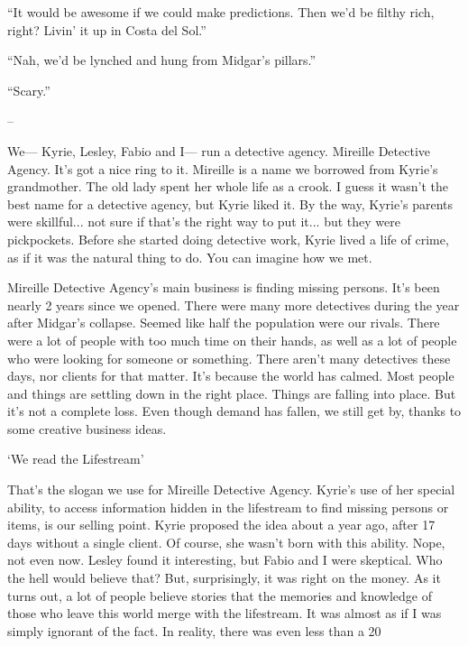 \documentclass[oneside]{book}
\begin{document}
“It would be awesome if we could make predictions. Then we’d be filthy rich, right? Livin’ it up in Costa del Sol.”

“Nah, we’d be lynched and hung from Midgar’s pillars.”

“Scary.”

–

We— Kyrie, Lesley, Fabio and I— run a detective agency. Mireille Detective Agency. It’s got a nice ring to it. Mireille is a name we borrowed from Kyrie’s grandmother. The old lady spent her whole life as a crook. I guess it wasn’t the best name for a detective agency, but Kyrie liked it. By the way, Kyrie’s parents were skillful... not sure if that’s the right way to put it... but they were pickpockets. Before she started doing detective work, Kyrie lived a life of crime, as if it was the natural thing to do. You can imagine how we met.

Mireille Detective Agency’s main business is finding missing persons. It’s been nearly 2 years since we opened. There were many more detectives during the year after Midgar’s collapse. Seemed like half the population were our rivals. There were a lot of people with too much time on their hands, as well as a lot of people who were looking for someone or something. There aren’t many detectives these days, nor clients for that matter. It’s because the world has calmed. Most people and things are settling down in the right place. Things are falling into place. But it’s not a complete loss. Even though demand has fallen, we still get by, thanks to some creative business ideas.

‘We read the Lifestream’

That’s the slogan we use for Mireille Detective Agency. Kyrie’s use of her special ability, to access information hidden in the lifestream to find missing persons or items, is our selling point. Kyrie proposed the idea about a year ago, after 17 days without a single client. Of course, she wasn’t born with this ability. Nope, not even now. Lesley found it interesting, but Fabio and I were skeptical. Who the hell would believe that? But, surprisingly, it was right on the money. As it turns out, a lot of people believe stories that the memories and knowledge of those who leave this world merge with the lifestream. It was almost as if I was simply ignorant of the fact. In reality, there was even less than a 20%
\end{document}

